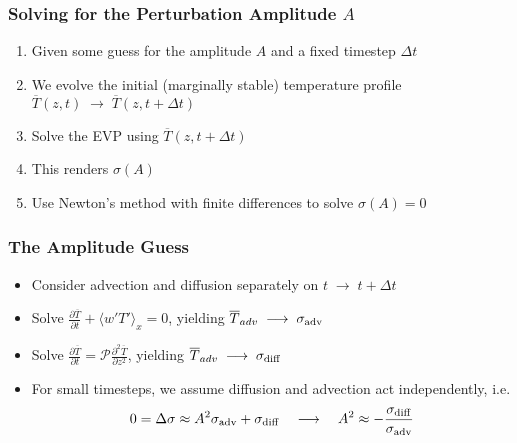 \begin{frame}[fragile]
    \frametitle{Solving for the Perturbation Amplitude $A$}
    \begin{enumerate}
        \item Given some guess for the amplitude $A$ and a fixed timestep $\Delta t$\newline
        
        \item We evolve the initial (marginally stable) temperature profile $\overline{T}(z,t) \; \longrightarrow \; \overline{T}(z,t+\Delta t)$\newline
        
        \item Solve the EVP using $\overline{T}(z,t+\Delta t)$\newline
        
        \item This renders $\sigma(A)$\newline
        
        \item Use Newton's method with finite differences to solve $\sigma(A) = 0$
    \end{enumerate}
    
\end{frame}

\begin{frame}[fragile]
    \frametitle{The Amplitude Guess}
    \begin{itemize}
        \item Consider advection and diffusion separately on $t\;\to\; t+\Delta t$\newline
        
        \item Solve $\frac{\partial\overline{T}}{\partial t} + \langle w'T' \rangle_x=0$, yielding $\overline{T}_{adv} \; \longrightarrow \; \sigma_{\rm{adv}}$\newline
        
        \item Solve $\frac{\partial\overline{T}}{\partial t} = \mathcal{P}\frac{\partial^2 \overline{T}}{\partial z^2}$, yielding $\overline{T}_{adv} \; \longrightarrow \; \sigma_{\rm{diff}}$\newline
        
        \item For small timesteps, we assume diffusion and advection act independently, i.e.
        \begin{equation}
            0 = \Delta \sigma \approx A^2\sigma_{\rm{adv}} + \sigma_{\rm{diff}} \quad \longrightarrow \quad A^2 \approx -\frac{\sigma_{\rm{diff}}}{\sigma_{\rm{adv}}}
        \end{equation}
    
    \end{itemize}
    
\end{frame}
